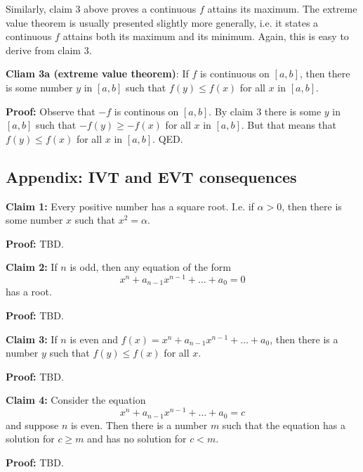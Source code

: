 \vs

Similarly, claim 3 above proves a continuous $f$ attains its maximum.
The extreme value theorem is usually presented slightly more
generally, i.e. it states a continuous $f$ attains both its maximum
and its minimum. Again, this is easy to derive from claim 3.

\vs

\textbf{Cliam 3a (extreme value theorem)}: If $f$ is continuous on
$[a,b]$, then there is some number $y$ in $[a,b]$ such that
$f(y)\leq f(x)$ for all $x$ in $[a,b]$.

\vs

\textbf{Proof:} Observe that $-f$ is continous on $[a,b]$. By claim 3
there is some $y$ in $[a,b]$ such that $-f(y)\geq-f(x)$ for all $x$ in
$[a,b]$. But that means that $f(y)\leq f(x)$ for all $x$ in $[a,b]$. QED.


\subsection{Appendix: IVT and EVT consequences}

\textbf{Claim 1:} Every positive number has a square root. I.e. if
$\alpha>0$, then there is some number $x$ such that $x^{2}=\alpha$.

\vs

\textbf{Proof:} TBD.

\vs

\textbf{Claim 2:} If $n$ is odd, then any equation of the form
\[x^{n}+a_{n-1}x^{n-1}+\ldots+a_{0}=0\]
has a root.

\vs

\textbf{Proof:} TBD.

\vs

\textbf{Claim 3:} If $n$ is even and
$f(x)=x^{n}+a_{n-1}x^{n-1}+\ldots+a_{0}$, then there is a number $y$ such
that $f(y)\leq f(x)$ for all $x$.

\vs

\textbf{Proof:} TBD.

\vs

\textbf{Claim 4:} Consider the equation
\[x^{n}+a_{n-1}x^{n-1}+\ldots+a_{0}=c\]
and suppose $n$ is even. Then there is a number $m$ such that the
equation has a solution for $c\geq m$ and has no solution for $c<m$.

\vs

\textbf{Proof:} TBD.

\vs



